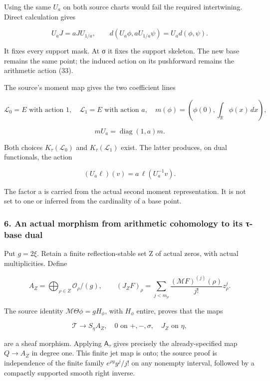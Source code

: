 Using the same \(U_a\) on both source charts would fail the required intertwining. Direct calculation gives

\[
U_aJ=aJU_{1/a},\qquad d(U_a\phi,aU_{1/a}\psi)=U_a d(\phi,\psi).
\tag{35}
\]

It fixes every support mask. At σ it fixes the support skeleton. The new base remains the same point; the induced action on its pushforward remains the arithmetic action (33).

The source's moment map gives the two coefficient lines

\[
\mathcal L_0=E\text{ with action }1,\quad
\mathcal L_1=E\text{ with action }a,
\quad
m(\phi)=(\phi(0),\int_{\mathbb R}\phi(x)\,dx),
\tag{36}
\]

\[
mU_a=\operatorname{diag}(1,a)m.
\]

Both choices \(K_\tau(\mathcal L_0)\) and \(K_\tau(\mathcal L_1)\) exist. The latter produces, on dual functionals, the action

\[
(U_a\ell)(v)=a\,\ell(U_a^{-1}v).
\tag{37}
\]

The factor a is carried from the actual second moment representation. It is not set to one or inferred from the cardinality of a base point.

\subsubsection{6. An actual morphism from arithmetic cohomology to its τ-base dual}\label{endpoint-tau_base--an-actual-morphism-from-arithmetic-cohomology-to-its-ux3c4-base-dual}

Put \(g=2\xi\). Retain a finite reflection-stable set Z of actual zeros, with actual multiplicities. Define

\[
A_Z=\bigoplus_{\rho\in Z}\mathcal O_\rho/(g),
\qquad
(J_ZF)_\rho=\sum_{j<m_\rho}
\frac{(\mathcal MF)^{(j)}(\rho)}{j!}z_\rho^j.
\tag{38}
\]

The source identity \(\mathcal M\Theta\phi=gH_\phi\), with \(H_\phi\) entire, proves that the maps

\[
\mathcal T\longrightarrow S_\eta A_Z,
\quad 0\text{ on }+, -,\sigma,\quad J_Z\text{ on }\eta,
\tag{39}
\]

are a sheaf morphism. Applying \(\mathsf A_\tau\) gives precisely the already-specified map \(Q\to A_Z\) in degree one. This finite jet map is onto; the source proof is independence of the finite family \(e^{\rho y}y^j/j!\) on any nonempty interval, followed by a compactly supported smooth right inverse.

